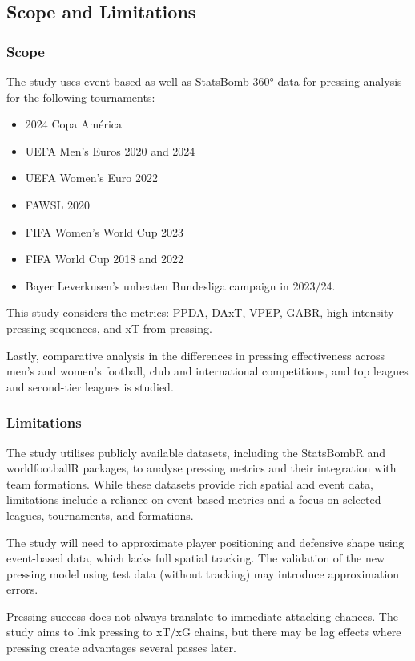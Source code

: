 \documentclass[12pt]{article}
\begin{document}
\subsection{Scope and Limitations}

\subsubsection{Scope}

The study uses event-based as well as StatsBomb 360° data for pressing analysis for the following tournaments:
\begin{itemize}
    \item 2024 Copa América
    \item UEFA Men's Euros 2020 and 2024
    \item UEFA Women's Euro 2022
    \item FAWSL 2020
    \item FIFA Women's World Cup 2023
    \item FIFA World Cup 2018 and 2022
    \item Bayer Leverkusen's unbeaten Bundesliga campaign in 2023/24.
\end{itemize}

This study considers the metrics: PPDA, DAxT, VPEP, GABR, high-intensity pressing sequences, and xT from pressing.

Lastly, comparative analysis in the differences in pressing effectiveness across men's and women's football, club and international competitions, and top leagues and second-tier leagues is studied.

\subsubsection{Limitations}

The study utilises publicly available datasets, including the StatsBombR and worldfootballR packages, to analyse pressing metrics and their integration with team formations. While these datasets provide rich spatial and event data, limitations include a reliance on event-based metrics and a focus on selected leagues, tournaments, and formations.

The study will need to approximate player positioning and defensive shape using event-based data, which lacks full spatial tracking. The validation of the new pressing model using test data (without tracking) may introduce approximation errors.

Pressing success does not always translate to immediate attacking chances. The study aims to link pressing to xT/xG chains, but there may be lag effects where pressing create advantages several passes later.
\end{document}

